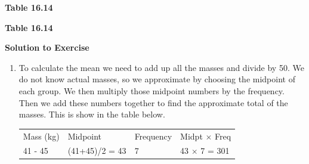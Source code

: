 \begin{description}[noitemsep]
\begin{description}[noitemsep]
{\begin{mdframed}[linewidth=4, leftmargin=40, rightmargin=40]
\begin{exercise}
\begin{table}[H]
\begin{center}
\begin{xtabular}[t]{|l|l|}
     \tabularnewline{}
    \end{xtabular}
      \end{center}
    \begin{center}{\small\bfseries Table 16.14}\end{center}
    \begin{caption}{\small\bfseries Table 16.14}\end{caption}
\end{table}
    \par
        \vspace{5pt}
        \label{m39400*solfhsst!!!underscore!!!id2044}\noindent\textbf{Solution to Exercise } \label{m39400*listfhsst!!!underscore!!!id2044}\begin{enumerate}[noitemsep, label=\textbf{Step} \textbf{\arabic*}. ] 
            \leftskip=20pt\rightskip=\leftskip\item  
        \label{m39400*id215169}To calculate the mean we need to add up all the masses and divide by 50. We do not know actual masses, so we approximate by choosing the midpoint of each group. We then multiply those midpoint numbers by the frequency. Then we add these numbers together to find the approximate total of the masses. This is show in the table below.\par 
          \begin{table}[H]
        \begin{center}
      \label{m39400*id215176}
    \noindent
      \tablelasttail{}
      \begin{xtabular}[t]{|l|l|l|l|}\hline
        Mass (kg) &
        Midpoint &
        Frequency &
        Midpt $\ensuremath{\times}$ Freq%
     \tabularnewline{}
        41 - 45 &
        (41+45)/2 = 43 &
        7 &
        43 $\ensuremath{\times}$ 7 = 301%
     \tabularnewline{}

\end{xtabular}
\end{center}
\end{table}
\end{enumerate}
\end{exercise}
\end{mdframed}}
\end{description}
\end{description}
